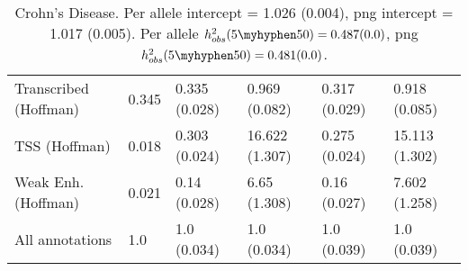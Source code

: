 \documentclass[11pt]{article}
\begin{document}
\begin{table}[H]
\begin{center}
\begin{tabular}{l|lllll}
Transcribed (Hoffman)  &  0.345 & 0.335 (0.028) & 0.969 (0.082) &
0.317 (0.029) & 0.918 (0.085) \\
TSS (Hoffman)  &  0.018 & 0.303 (0.024) & 16.622 (1.307) &
0.275 (0.024) & 15.113 (1.302) \\
Weak Enh. (Hoffman)  &  0.021 & 0.14 (0.028) & 6.65 (1.308) &
0.16 (0.027) & 7.602 (1.258) \\
All annotations  &  1.0 & 1.0 (0.034) & 1.0 (0.034) &
1.0 (0.039) & 1.0 (0.039) \\
\end{tabular}
\caption{Crohn's Disease.
Per allele intercept = 1.026 (0.004),
png intercept = 1.017 (0.005).
Per allele $h^2_{obs}(5\myhyphen50) = 0.487 (0.0)$,
png $h^2_{obs}(5\myhyphen50) = 0.481 (0.0)$.}
\end{center}
\end{table}
\end{document}
